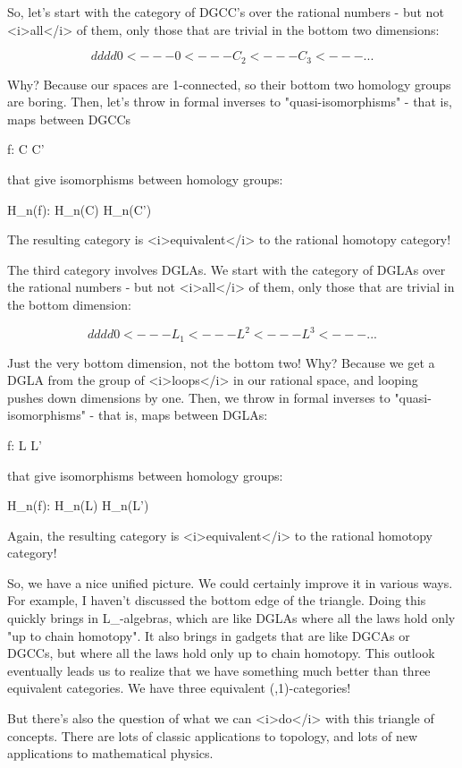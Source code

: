 So, let's start with the category of DGCC's over the rational
numbers - but not <i>all</i> of them, only those that are trivial in
the bottom two dimensions:


$$

    d      d       d       d
0 <--- 0 <--- C_{2} <--- C_{3} <--- ...
$$
    

Why?  Because our spaces are 1-connected, so their bottom two
homology groups are boring.  Then, let's throw in formal inverses to
"quasi-isomorphisms" - that is, maps between DGCCs

f: C \to  C'

that give isomorphisms between homology groups:

H_{n}(f): H_{n}(C) \to  H_{n}(C')

The resulting category is <i>equivalent</i> to the rational 
homotopy category!

The third category involves DGLAs.  We start with the category of
DGLAs over the rational numbers - but not <i>all</i> of them, only
those that are trivial in the bottom dimension:


$$

    d       d       d      d
0 <--- L_{1} <--- L^{2} <--- L^{3} <--- ...
$$
    

Just the very bottom dimension, not the bottom two!  Why?  Because we
get a DGLA from the group of <i>loops</i> in our rational space, and
looping pushes down dimensions by one.  Then, we throw in formal
inverses to "quasi-isomorphisms" - that is, maps between
DGLAs:

f: L \to  L'

that give isomorphisms between homology groups:

H_{n}(f): H_{n}(L) \to  H_{n}(L')

Again, the resulting category is <i>equivalent</i> to the rational 
homotopy category!

So, we have a nice unified picture.  We could certainly improve it in
various ways.  For example, I haven't discussed the bottom edge of the
triangle.  Doing this quickly brings in L_{\infty }-algebras,
which are like DGLAs where all the laws hold only "up to chain
homotopy".  It also brings in gadgets that are like DGCAs or
DGCCs, but where all the laws hold only up to chain homotopy.  This
outlook eventually leads us to realize that we have something much
better than three equivalent categories.  We have three equivalent
(\infty ,1)-categories!

But there's also the question of what we can <i>do</i> with this
triangle of concepts.  There are lots of classic applications
to topology, and lots of new applications to mathematical
physics.  

